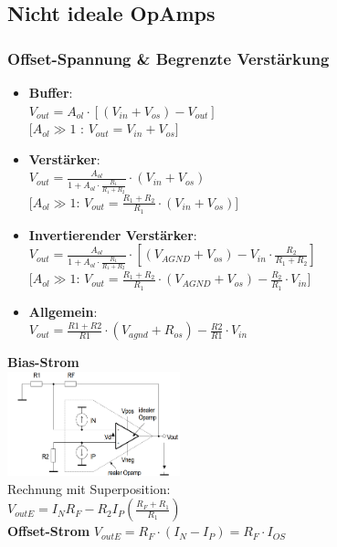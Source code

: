 \documentclass[margin=normal]{tex/hsrzf}
\begin{document}
\endgroup
\begin{multicols*}{2}
\subsection{Nicht ideale OpAmps}

  \small
  \subsubsection*{Offset-Spannung \& Begrenzte Verstärkung}
  \begin{itemize}
    \item \textbf{Buffer}: \\
          $V_{out} = A_{ol} \cdot [(V_{in}+V_{os}) - V_{out}]$
          \\$[A_{ol}\gg 1$ : $V_{out} = V_{in} + V_{os}]$

    \item \textbf{Verstärker}: \\
          $V_{out} = \frac{A_{ol}}{1+A_{ol}\cdot\frac{R_1}{R_1+R_2}}\cdot(V_{in}+V_{os}) $
          \\$[A_{ol}\gg 1$: $V_{out} = \frac{R_1+R_2}{R_1}\cdot(V_{in}+V_{os})]$

    \item \textbf{Invertierender Verstärker}: \\
          $V_{out} = \frac{A_{ol}}{1+A_{ol}\cdot\frac{R_1}{R_1+R_2}}\cdot[(V_{AGND} + V_{os})-V_{in}\cdot\frac{R_2}{R_1+R_2}]$
          \\ $[A_{ol}\gg 1$: $V_{out} = \frac{R_1 + R_2}{R_1}\cdot(V_{AGND}+V_{os})-\frac{R_2}{R_1}\cdot V_{in}]$

    \item \textbf{Allgemein}: \\
          $V_{out} = \frac{R1 + R2}{R1}\cdot(V_{agnd}+R_{os})-\frac{R2}{R1}\cdot V_{in}$

  \end{itemize}
  \textbf{Bias-Strom}\\
  \includegraphics[width=5cm]{img/OpAmp/Fehler_Eingangsstrom.png}\\
  Rechnung mit Superposition:\\
  $V_{out E} = I_NR_F-R_2I_P(\frac{R_F+R_1}{R_1}) $\\
  \textbf{Offset-Strom}
  $V_{out E} = R_F\cdot(I_N-I_P) = R_F\cdot I_{OS}$

\end{multicols*}
\end{document}

